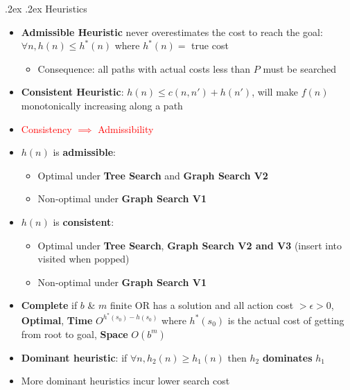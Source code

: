 \documentclass[10pt,landscape,a4paper]{article}
\makeatletter
\renewcommand{\section}{\@startsection{section}{1}{0mm}%
	{.2ex}%
	{.2ex}%
	{\color{myblue}\sffamily\small\bfseries}}
\makeatother
\begin{document}
\begin{multicols*}{4}
	\section{Heuristics}
	  \begin{itemize}
		\item \textbf{Admissible Heuristic} never overestimates the cost to reach the goal: $\forall n, h(n) \leq h^*(n)$ where $h^*(n) = $ true cost
		\begin{itemize}
			\item Consequence: all paths with actual costs less than $P$ must be searched
		\end{itemize}
		\item \textbf{Consistent Heuristic}: $h(n) \leq c(n, n') + h(n')$, will make $f(n)$ monotonically increasing along a path
		\item \textcolor{red}{Consistency $\implies$ Admissibility}
		\item $h(n)$ is \textbf{admissible}:
		\begin{itemize}
			\item Optimal under \textbf{Tree Search} and \textbf{Graph Search V2}
			\item Non-optimal under \textbf{Graph Search V1}
		\end{itemize}
		\item $h(n)$ is \textbf{consistent}: 
		\begin{itemize}
			\item Optimal under \textbf{Tree Search}, \textbf{Graph Search V2 and V3} (insert into visited when popped)
			\item Non-optimal under \textbf{Graph Search V1}
		\end{itemize}
		\item \textbf{Complete} if $b$ \& $m$ finite OR has a solution and all action cost $> \epsilon > 0$, \textbf{Optimal}, \textbf{Time} $O^{h^*(s_0) - h(s_0)}$ where $h^*(s_0)$ is the actual cost of getting from root to goal, \textbf{Space} $O(b^m)$
		\item \textbf{Dominant heuristic}: if $\forall n, h_2(n) \geq h_1(n)$ then $h_2$ \textbf{dominates} $h_1$
		\item More dominant heuristics incur lower search cost
		\end{itemize}

\end{multicols*}
\end{document}
